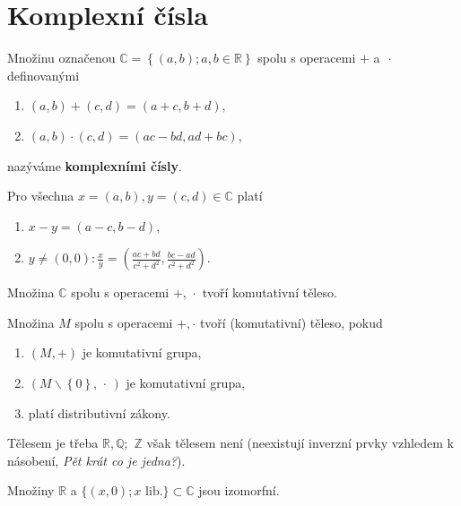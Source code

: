 \section{Komplexní čísla}
\begin{definition}\label{kompl_c_def}
Množinu označenou $\mathbb C = \left \{ (a,b);  a,b \in \mathbb R \right \} $
spolu s operacemi $+$ a $\,\cdot\,$ definovanými
\begin{enumerate}[$i.$]
\item $(a,b) + (c,d) = (a+c, b+d),$
\item $(a,b) \cdot (c,d) = (ac-bd, ad+bc)$,
\end{enumerate}
nazýváme \textbf{komplexními čísly}.
\end{definition}

\begin{veta}
    Pro všechna $x=(a,b),y=(c,d) \in \mathbb C$ platí
    \begin{enumerate}[$i.$]
    \item $x-y=(a-c, b-d)$,
   	\item $y\ne (0,0)\colon  \frac{x}{y}=\left ( \frac{ac+bd}{c^2+d^2}, \frac{bc-ad}{c^2+d^2} \right ) .$
    \end{enumerate}
\end{veta}

\begin{veta}
    Množina $\mathbb C$ spolu s operacemi $+,\,\cdot$ tvoří komutativní těleso.
\end{veta}

\begin{pozn}\label{teleso}
    Množina $M$ spolu s operacemi $+,\cdot$ tvoří (komutativní) těleso, pokud
    \begin{enumerate}[$i.$]
    \item $(M,+)$ je komutativní grupa,
   	\item $(M\smallsetminus\left \{ 0 \right \} ,\,\cdot\,)$ je komutativní grupa,
   	\item platí distributivní zákony.
    \end{enumerate}
    Tělesem je třeba $\mathbb R, \mathbb Q;$ $\mathbb Z$ však tělesem není (neexistují
    inverzní prvky vzhledem k násobení, \textit{Pět krát co je jedna?}).
\end{pozn}

\begin{veta}
    Množiny $\mathbb R$ a $\{(x,0); x\text{ lib.}\} \subset \mathbb C$ jsou izomorfní.
\end{veta}

